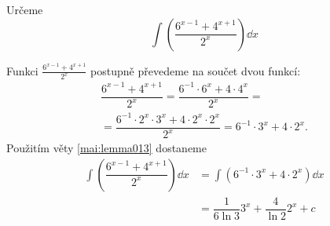 \begin{mdframed}[style=mdexam]
  \begin{example}\label{MAI:exam147} 
    Určeme \[\int\left(\dfrac{6^{x-1} + 4^{x+1}}{2^x}\right)\dd{x}\]
    
    Funkci \(\frac{6^{x-1} + 4^{x+1}}{2^x}\) postupně převedeme na součet dvou funkcí:
    \begin{multline*}
        \dfrac{6^{x-1} + 4^{x+1}}{2^x} = \dfrac{6^{-1}\cdot6^x + 4\cdot4^x}{2^x} =   \\
      = \dfrac{6^{-1}\cdot2^x\cdot3^x + 4\cdot2^x\cdot2^x}{2^x} = 6^{-1}\cdot3^x + 4\cdot2^x. 
    \end{multline*}
    Použitím věty \ref{mai:lemma013} dostaneme
    \begin{align*}
      \int\left(\dfrac{6^{x-1} + 4^{x+1}}{2^x}\right)\dd{x} 
          &= \int(6^{-1}\cdot3^x + 4\cdot2^x)\dd{x}                                 \\
          &= \dfrac{1}{6\ln3}3^x + \dfrac{4}{\ln2}2^x + c
    \end{align*}
  \end{example}
\end{mdframed}